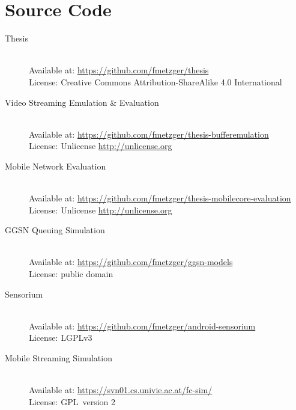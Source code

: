 \chapter*{Source Code}
%

\begin{description}
	\item[Thesis]\hfill \\
	Available at: \url{https://github.com/fmetzger/thesis} \\ %
	License: Creative Commons Attribution-ShareAlike 4.0 International \cite{ccbysa40}

	\item[Video Streaming Emulation \& Evaluation]\hfill \\
	Available at: \url{https://github.com/fmetzger/thesis-bufferemulation} \\
	License: Unlicense \url{http://unlicense.org}

	\item[Mobile Network Evaluation]\hfill \\
	Available at: \url{https://github.com/fmetzger/thesis-mobilecore-evaluation}  \\
	License: Unlicense \url{http://unlicense.org}

	\item[GGSN Queuing Simulation]\hfill \\
	Available at: \url{https://github.com/fmetzger/ggsn-models} \\
	License: public domain

	\item[Sensorium]\hfill \\
	Available at: \url{https://github.com/fmetzger/android-sensorium} \\
	License: \gls{LGPLv3}~\cite{lgplv3}

	\item[Mobile Streaming Simulation]\hfill \\
	Available at: \url{https://svn01.cs.univie.ac.at/fc-sim/} \\ %
	License: \gls{GPL}~version 2~\cite{gplv2}

\end{description}